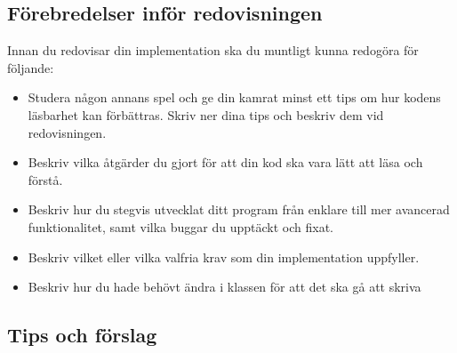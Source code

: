 \subsection{Förebredelser inför redovisningen}
\Checkpoint\noindent Innan du redovisar din implementation ska du muntligt kunna redogöra för följande:
\begin{itemize}[nosep, label={$\square$}]
  \item Studera någon annans spel och ge din kamrat minst ett tips om hur kodens läsbarhet kan förbättras. Skriv ner dina tips och beskriv dem vid redovisningen.
  \item Beskriv vilka åtgärder du gjort för att din kod ska vara lätt att läsa och förstå.
  \item Beskriv hur du stegvis utvecklat ditt program från enklare till mer avancerad funktionalitet, samt vilka buggar du upptäckt och fixat.
  \item Beskriv vilket eller vilka valfria krav som din implementation uppfyller.
  \item Beskriv hur du hade behövt ändra i klassen  för att det ska gå att skriva 
\end{itemize}

\subsection{Tips och förslag}

